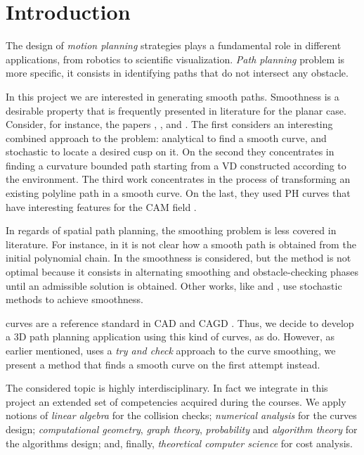 \documentclass[dissertation.tex]{subfiles}
\begin{document}
\chapter{Introduction}
The design of \emph{motion planning} strategies plays a fundamental
role in different applications, from robotics to scientific
visualization. \emph{Path planning} problem is
more specific, it consists in identifying paths that do not
intersect any obstacle.

In this project we are interested in generating smooth
paths. Smoothness is a desirable property that is
frequently presented in literature for the planar case. Consider, for
instance, the papers \cite{maekawa}, \cite{ho-liu}, \cite{li} and
\cite{giannelli}. The first considers an interesting combined
approach to the problem: analytical to find a smooth curve, and
stochastic to locate a desired cusp on it. On the second they
concentrates in finding a curvature bounded path starting from a
\acf{VD} constructed according to the environment. The third work concentrates in
the process of transforming an existing polyline path in a smooth
curve. On the last, they used
\acf{PH} curves that have interesting features for the \acf{CAM} field
\cite{farouki}.

In regards of spatial path planning, the smoothing problem is less
covered in literature. For instance, in \cite{hrabar} it is not clear
how a smooth path is obtained from the initial polynomial chain. In
\cite{yang} the smoothness is considered, but the method is not
optimal because it consists in alternating smoothing and
obstacle-checking phases until an admissible solution is
obtained. Other works, like \cite{aghababa} and \cite{kroumov}, use 
stochastic methods to achieve smoothness.

\bs curves are a reference standard in \acf{CAD} and \acf{CAGD}
\cite{hughes}\cite{foley}\cite{farin}\cite{farin2}. Thus, we decide to
develop a 3D path planning application using this kind of curves, as
\cite{yang} do. However, as earlier mentioned,
\cite{yang} uses a \emph{try and check} approach to the curve
smoothing, we present a method that finds a smooth
curve on the first 
attempt instead.

The considered topic is highly interdisciplinary. In fact we integrate
in this project an extended set of
competencies acquired during the courses. We apply notions of
\emph{linear algebra} for the collision checks; \emph{numerical
  analysis} for the curves design; \emph{computational
  geometry},
\emph{graph theory}, \emph{probability} and \emph{algorithm theory}
for the algorithms design; and, finally, \emph{theoretical computer
  science} for cost analysis.
\end{document}
